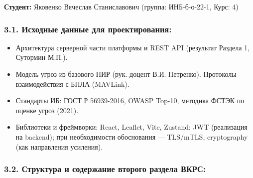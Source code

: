 \textbf{Студент:} Яковенко Вячеслав Станиславович (группа: ИНБ-б-о-22-1, Курс: 4)

\hypertarget{ux438ux441ux445ux43eux434ux43dux44bux435-ux434ux430ux43dux43dux44bux435-ux434ux43bux44f-ux43fux440ux43eux435ux43aux442ux438ux440ux43eux432ux430ux43dux438ux44f-1}{%
\subsubsection{3.1. Исходные данные для проектирования:}\label{ux438ux441ux445ux43eux434ux43dux44bux435-ux434ux430ux43dux43dux44bux435-ux434ux43bux44f-ux43fux440ux43eux435ux43aux442ux438ux440ux43eux432ux430ux43dux438ux44f-1}}

\begin{itemize}
\tightlist
\item
  Архитектура серверной части платформы и REST API (результат Раздела 1, Сутормин М.П.).
\item
  Модель угроз из базового НИР (рук. доцент В.И. Петренко). Протоколы взаимодействия с БПЛА (MAVLink).
\item
  Стандарты ИБ: ГОСТ Р 56939-2016, OWASP Top-10, методика ФСТЭК по оценке угроз (2021).
\item
  Библиотеки и фреймворки: React, Leaflet, Vite, Zustand; JWT (реализация на backend); при необходимости обоснования --- TLS/mTLS, cryptography (как направления усиления).
\end{itemize}

\hypertarget{ux441ux442ux440ux443ux43aux442ux443ux440ux430-ux438-ux441ux43eux434ux435ux440ux436ux430ux43dux438ux435-ux432ux442ux43eux440ux43eux433ux43e-ux440ux430ux437ux434ux435ux43bux430-ux432ux43aux440ux441}{%
\subsubsection{3.2. Структура и содержание второго раздела ВКРС:}\label{ux441ux442ux440ux443ux43aux442ux443ux440ux430-ux438-ux441ux43eux434ux435ux440ux436ux430ux43dux438ux435-ux432ux442ux43eux440ux43eux433ux43e-ux440ux430ux437ux434ux435ux43bux430-ux432ux43aux440ux441}}

